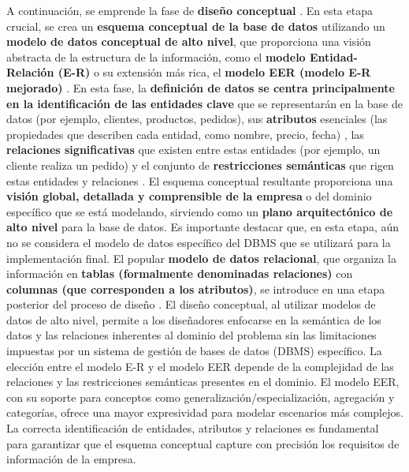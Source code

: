 A continuación, se emprende la fase de \textbf{diseño conceptual} \cite{Fundamentos-de-Sistemas-de-Bases-de-Datos.pdf:61, FBD_1.pdf:1}. En esta etapa crucial, se crea un \textbf{esquema conceptual de la base de datos} utilizando un \textbf{modelo de datos conceptual de alto nivel}, que proporciona una visión abstracta de la estructura de la información, como el \textbf{modelo Entidad-Relación (E-R)} o su extensión más rica, el \textbf{modelo EER (modelo E-R mejorado)} \cite{Fundamentos-de-Sistemas-de-Bases-de-Datos.pdf:61}. En esta fase, la \textbf{definición de datos se centra principalmente en la identificación de las entidades clave} que se representarán en la base de datos (por ejemplo, clientes, productos, pedidos), sus \textbf{atributos} esenciales (las propiedades que describen cada entidad, como nombre, precio, fecha) \cite{Fundamentos-de-Sistemas-de-Bases-de-Datos.pdf:61}, las \textbf{relaciones significativas} que existen entre estas entidades (por ejemplo, un cliente realiza un pedido) y el conjunto de \textbf{restricciones semánticas} que rigen estas entidades y relaciones \cite{Fundamentos-de-Sistemas-de-Bases-de-Datos.pdf:61}. El esquema conceptual resultante proporciona una \textbf{visión global, detallada y comprensible de la empresa} o del dominio específico que se está modelando, sirviendo como un \textbf{plano arquitectónico de alto nivel} para la base de datos. Es importante destacar que, en esta etapa, aún no se considera el modelo de datos específico del DBMS que se utilizará para la implementación final. El popular \textbf{modelo de datos relacional}, que organiza la información en \textbf{tablas (formalmente denominadas relaciones)} con \textbf{columnas (que corresponden a los atributos)}, se introduce en una etapa posterior del proceso de diseño \cite{Fundamentos-de-Sistemas-de-Bases-de-Datos.pdf:61}.  El diseño conceptual, al utilizar modelos de datos de alto nivel, permite a los diseñadores enfocarse en la semántica de los datos y las relaciones inherentes al dominio del problema sin las limitaciones impuestas por un sistema de gestión de bases de datos (DBMS) específico. La elección entre el modelo E-R y el modelo EER depende de la complejidad de las relaciones y las restricciones semánticas presentes en el dominio. El modelo EER, con su soporte para conceptos como generalización/especialización, agregación y categorías, ofrece una mayor expresividad para modelar escenarios más complejos. La correcta identificación de entidades, atributos y relaciones es fundamental para garantizar que el esquema conceptual capture con precisión los requisitos de información de la empresa.

